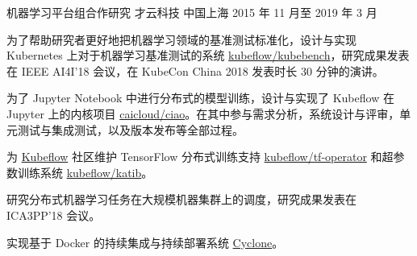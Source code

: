 \begin{cventries}
  \cventry
    {机器学习平台组合作研究} %
    {才云科技} %
    {中国上海} %
    {2015 年 11 月至 2019 年 3 月} %
    {
      \begin{cvitems} %
        \item 为了帮助研究者更好地把机器学习领域的基准测试标准化，设计与实现 Kubernetes 上对于机器学习基准测试的系统 \href{https://github.com/kubeflow/kubebench}{kubeflow/kubebench}，研究成果发表在 IEEE AI4I'18 会议，在 KubeCon China 2018 发表时长 30 分钟的演讲。
        \item 为了 Jupyter Notebook 中进行分布式的模型训练，设计与实现了 Kubeflow 在 Jupyter 上的内核项目 \href{https://github.com/caicloud/ciao}{caicloud/ciao}。在其中参与需求分析，系统设计与评审，单元测试与集成测试，以及版本发布等全部过程。
        \item 为 \href{https://github.com/kubeflow/kubeflow}{Kubeflow} 社区维护 TensorFlow 分布式训练支持 \href{https://github.com/kubeflow/tf-operator}{kubeflow/tf-operator} 和超参数训练系统 \href{https://github.com/kubeflow/katib}{kubeflow/katib}。
        \item 研究分布式机器学习任务在大规模机器集群上的调度，研究成果发表在 ICA3PP'18 会议。
        \item 实现基于 Docker 的持续集成与持续部署系统 \href{https://github.com/caicloud/cyclone}{Cyclone}。
      \end{cvitems}
    }

\end{cventries}
